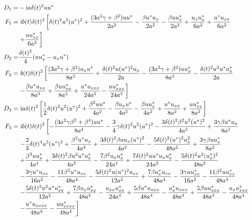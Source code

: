 \documentclass[12pt]{article}
\begin{document}
\begin{align}
  D_{1} =& -\mathrm{i}a\delta(t)^{2} uu^{*} \\
  F_{1} =&\ \mathrm{i}b(t)\delta(t)^{2} \left[\delta(t)^2u^2(u^*)^2 + \frac{(3a^2\gamma + \beta^2)uu^*}{2a^2} - \frac{\beta u^*u_x}{2a^2} - \frac{\beta uu^*_x}{2a^2} + \frac{u_xu^*_x}{6a^2} + \frac{u^*u_{xx}}{6a^2} \right. \notag \\
  & \left. + \frac{uu^*_{xx}}{6a^2} \right] \\
  D_{2} =& \frac{\delta(t)^{2}}{4}(uu^{*}_{x} - u_{x}u^{*}) \\
  F_{2} =&\ b(t)\delta(t)^{2} \left[\frac{(3a^2\gamma+\beta^2)u_xu^*}{8a^3} + \frac{\delta(t)^2u(u^*)^2u_x}{2a} - \frac{(3a^2\gamma+\beta^2)uu^*_x}{8a^3} - \frac{\delta(t)^2u^2u^*u^*_x}{2a} \right. \notag\\
  & \left. - \frac{\beta u^*u_{xx}}{8a^3} + \frac{\beta uu^*_{xx}}{8a^3} + \frac{u^*u_{xxx}}{24a^3} - \frac{uu^*_{xxx}}{24a^3}\right] \\
  D_{3} =&\ \mathrm{i}a\delta(t)^2\left[\frac{1}{2}\delta(t)^2u^2(u^*)^2 + \frac{\beta^2 uu^*}{4a^2} - \frac{\beta u_xu^*}{4a^2} - \frac{\beta uu^*_x}{4a^2} + \frac{u^*u_{xx}}{8a^2} + \frac{uu^*_{xx}}{8a^2}\right] \\
  F_{3} =&\ \mathrm{i}b(t)\delta(t)^{2} \left[ -\frac{(3a^2\gamma\beta^2+\beta^4)uu^*}{8a^4} -\frac{3}{4}\gamma\delta(t)^2u^2(u^*)^2 -\frac{3\delta(t)^2\beta^2 u^2(u^*)^2}{4a^2} + \frac{3\gamma\beta u^*u_x}{8a^2} \right. \notag \\
  & \left. -\frac{2}{3}\delta(t)^4u^3(u^*)^3 + \frac{\beta^3 u^*u_x}{4a^4} + \frac{3\delta(t)^2\beta uu_x(u^*)^2}{4a^2} -\frac{5\delta(t)^2(u^*)^2u_x^2}{48a^2} + \frac{3\gamma\beta uu^*_x}{8a^2}  \right. \notag \\
  & \left. + \frac{\beta^3 uu^*_x}{4a^4} +\frac{3\delta(t)^2\beta u^2u^*u^*_x}{4a^2} - \frac{7\beta^2 u_xu^*_x}{24a^4} +\frac{7\delta(t)^2 uu^*u_xu^*_x}{24a^2} - \frac{5\delta(t)^2 u^2(u^*_x)^2}{48a^2}  \right. \notag\\
  & \left. -\frac{3\gamma u^*u_{xx}}{16a^2} -\frac{11\beta^2u^*u_{xx}}{48a^4} -\frac{5\delta(t)^2u(u^*)^2u_{xx}}{12a^2} + \frac{7\beta u^*_xu_{xx}}{48a^4} -\frac{3\gamma uu^*_{xx}}{16a^2} - \frac{11\beta^2 uu^*_{xx}}{48a^4} \right. \notag \\
  & \left. - \frac{5\delta(t)^2u^2u^*u^*_{xx}}{12a^2} + \frac{7\beta u_xu^*_{xx}}{48a^4}  -\frac{u_{xx}u^*_{xx}}{24a^4} + \frac{5\beta u^*u_{xxx}}{48a^4} - \frac{u^*_xu_{xxx}}{48a^4} + \frac{5\beta uu^*_{xxx}}{48a^4} - \frac{u_xu^*_{xxx}}{48a^4} \right. \notag \\
  & \left. -\frac{u^*u_{xxxx}}{48a^4} -\frac{uu^*_{xxxx}}{48a^4} \right]
\end{align}
\end{document}
